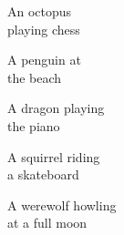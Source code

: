 \begin{figure*}[]
\begin{minipage}[t]{.025\textwidth}
     \vspace{0pt}
\end{minipage}%
\hspace{1ex}%
\begin{minipage}[t]{0.98\figwidth}
    \vspace{1mm}
    \begin{minipage}[t]{0.2\textwidth}
        \centering
        An octopus\\playing chess
    \end{minipage}%
    \begin{minipage}[t]{0.2\textwidth}
        \centering
        A penguin at\\the beach
    \end{minipage}%
    \begin{minipage}[t]{0.2\textwidth}
        \centering
        A dragon playing\\the piano
    \end{minipage}%
    \begin{minipage}[t]{0.2\textwidth}
        \centering
        A squirrel riding\\a skateboard
    \end{minipage}%
    \begin{minipage}[t]{0.2\textwidth}
        \centering
        A werewolf howling\\at a full moon
    \end{minipage}%
\end{minipage}


\end{figure*}
